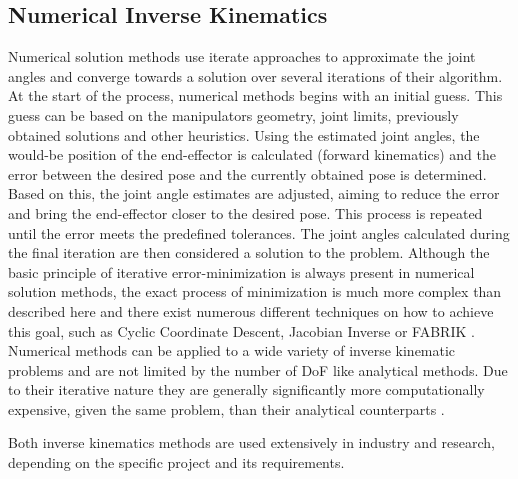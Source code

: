 \subsection{Numerical Inverse Kinematics}
Numerical solution methods use iterate approaches to approximate the joint angles and converge towards a solution over several iterations of their algorithm.
At the start of the process, numerical methods begins with an initial guess.
This guess can be based on the manipulators geometry, joint limits, previously obtained solutions and other heuristics.
Using the estimated joint angles, the would-be position of the end-effector is calculated (forward kinematics) and the error between the desired pose and the currently obtained pose is determined.
Based on this, the joint angle estimates are adjusted, aiming to reduce the error and bring the end-effector closer to the desired pose.
This process is repeated until the error meets the predefined tolerances.
The joint angles calculated during the final iteration are then considered a solution to the problem.
Although the basic principle of iterative error-minimization is always present in numerical solution methods, the exact process of minimization is much more complex than described here and there exist numerous different techniques on how to achieve this goal, such as Cyclic Coordinate Descent, Jacobian Inverse or FABRIK \parencite{AristidouFABRIK}. 
Numerical methods can be applied to a wide variety of inverse kinematic problems and are not limited by the number of DoF like analytical methods.
Due to their iterative nature they are generally significantly more computationally expensive, given the same problem, than their analytical counterparts \parencite{aristidou2018inverse, inverseKinematicsIllinois}.

Both inverse kinematics methods are used extensively in industry and research, depending on the specific project and its requirements.


